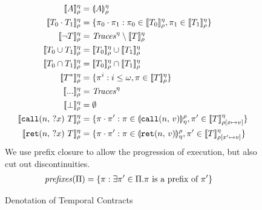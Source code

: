 \FloatBarrier
\begin{figure}
  \begin{align*}
   \denotetcon{\mevent}{\mtimeline}{\menv} &=
   \denoteevent{\mevent}{\menv}{\mtimeline}
\\
   \denotetcon{\stseq{\mtcon_0}{\mtcon_1}}{\mtimeline}{\menv} &=
   \setbuild{\mtrace_0 \cdot \mtrace_1}{\mtrace_0 \in \denotetcon{\mtcon_0}{\mtimeline}{\menv}, \mtrace_1 \in \denotetcon{\mtcon_1}{\mtimeline}{\menv}}
\\
   \denotetcon{\stnot{\mtcon}}{\mtimeline}{\menv} &=
   \Traces^\mtimeline \setminus \denotetcon{\mtcon}{\mtimeline}{\menv} %
\\
   \denotetcon{\stOr{\mtcon_0}{\mtcon_1}}{\mtimeline}{\menv} &=
   \denotetcon{\mtcon_0}{\mtimeline}{\menv} \cup \denotetcon{\mtcon_1}{\mtimeline}{\menv}
\\
   \denotetcon{\stAnd{\mtcon_0}{\mtcon_1}}{\mtimeline}{\menv} &=
   \denotetcon{\mtcon_0}{\mtimeline}{\menv} \cap \denotetcon{\mtcon_1}{\mtimeline}{\menv}
\\
   \denotetcon{\stmany{\mtcon}}{\mtimeline}{\menv} &=
   \setbuild{\mtrace^i}{i \le \omega, \mtrace \in \denotetcon{\mtcon}{\mtimeline}{\menv}}
\\
   \denotetcon{\sddd}{\mtimeline}{\menv} &=
   \Traces^\mtimeline
\\
   \denotetcon{\stfail}{\mtimeline}{\menv} &= \emptyset
\\
   \denotetcon{\stcall{\mname}{\mvar}{\mtcon}}{\mtimeline}{\menv} &=
   \setbuild{\mtrace \cdot \mtrace'}
            {\mtrace \in \denoteevent{\scallev{\mname}{\mval}}{\mtimeline}{\menv},
             \mtrace' \in \denotetcon{\mtcon}{\mtimeline}{\menv[\mvar \mapsto \mval]}}
\\
   \denotetcon{\stret{\mname}{\mvar}{\mtcon}}{\mtimeline}{\menv} &=
   \setbuild{\mtrace\cdot \mtrace'}
            {\mtrace \in \denoteevent{\sretev{\mname}{\mval}}{\mtimeline}{\menv},
             \mtrace' \in \denotetcon{\mtcon}{\mtimeline}{\menv[\mvar' \mapsto \mval]}}
  \end{align*}
  We use prefix closure to allow the progression of execution, but also cut out discontinuities.
  \begin{align*}
    \mathit{prefixes}(\Pi) &= \{\pi : \exists \pi' \in \Pi. \pi \text{ is a prefix of } \pi'\}
  \end{align*}
  \caption{Denotation of Temporal Contracts}
  \label{fig:tcontract-denotation}
\end{figure}

